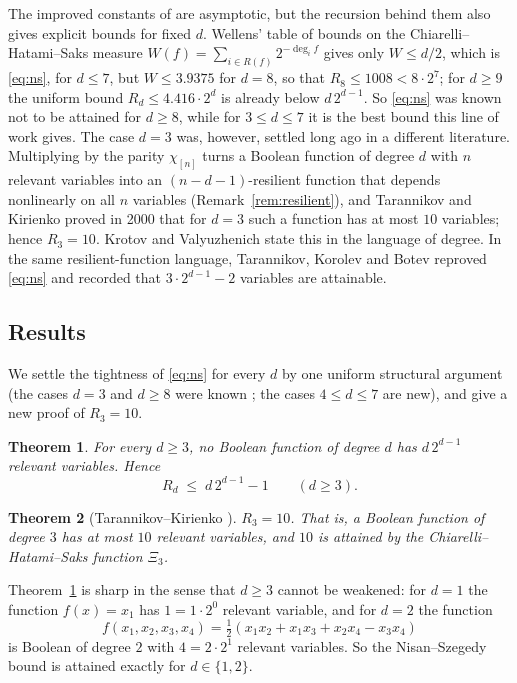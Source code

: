 \documentclass[11pt,reqno]{amsart}
\theoremstyle{plain}
\newtheorem{theorem}{Theorem}
\theoremstyle{definition}
\numberwithin{theorem}{section}
\newcommand{\XiC}{\Xi}
\begin{document}
The improved constants of \cite{CHS20,Wel22} are asymptotic, but the recursion behind them also
gives explicit bounds for fixed $d$. Wellens' table of bounds on the Chiarelli--Hatami--Saks
measure $W(f) = \sum_{i \in R(f)} 2^{-\deg_i f}$ \cite[Table~2]{Wel19} gives only $W \le d/2$,
which is \eqref{eq:ns}, for $d \le 7$, but $W \le 3.9375$ for $d = 8$, so that
$R_8 \le 1008 < 8 \cdot 2^7$; for $d \ge 9$ the uniform bound $R_d \le 4.416 \cdot 2^d$ is
already below $d\,2^{d-1}$. So \eqref{eq:ns} was known not to be attained for $d \ge 8$, while
for $3 \le d \le 7$ it is the best bound this line of work gives. The case $d = 3$ was, however,
settled long ago in a different literature. Multiplying by the parity $\chi_{[n]}$ turns a
Boolean function of degree $d$ with $n$ relevant variables into an $(n-d-1)$-resilient function
that depends nonlinearly on all $n$ variables (Remark~\ref{rem:resilient}), and Tarannikov and
Kirienko \cite{TK00} proved in 2000 that for $d = 3$ such a function has at most $10$ variables;
hence $R_3 = 10$. Krotov and Valyuzhenich \cite{KV24} state this in the language of degree. In
the same resilient-function language, Tarannikov, Korolev and Botev \cite{TKB01} reproved
\eqref{eq:ns} and recorded that $3 \cdot 2^{d-1} - 2$ variables are attainable.

\subsection{Results}
We settle the tightness of \eqref{eq:ns} for every $d$ by one uniform structural argument (the
cases $d = 3$ and $d \ge 8$ were known \cite{TK00,Wel19}; the cases $4 \le d \le 7$ are new), and
give a new proof of $R_3 = 10$.

\begin{theorem}\label{thm:main-ns}
For every $d \ge 3$, no Boolean function of degree $d$ has $d\,2^{d-1}$ relevant variables.
Hence
\[
  R_d \;\le\; d\,2^{d-1} - 1 \qquad (d \ge 3).
\]
\end{theorem}

\begin{theorem}[Tarannikov--Kirienko \cite{TK00}]\label{thm:main-r3}
$R_3 = 10$. That is, a Boolean function of degree $3$ has at most $10$ relevant variables, and
$10$ is attained by the Chiarelli--Hatami--Saks function $\XiC_3$.
\end{theorem}

Theorem~\ref{thm:main-ns} is sharp in the sense that $d \ge 3$ cannot be weakened: for $d = 1$
the function $f(x) = x_1$ has $1 = 1 \cdot 2^0$ relevant variable, and for $d = 2$ the function
\begin{equation}\label{eq:degree2extremal}
  f(x_1,x_2,x_3,x_4) = \tfrac12\left( x_1x_2 + x_1x_3 + x_2x_4 - x_3x_4 \right)
\end{equation}
is Boolean of degree $2$ with $4 = 2 \cdot 2^1$ relevant variables. So the Nisan--Szegedy bound
is attained exactly for $d \in \{1,2\}$.
\end{document}

